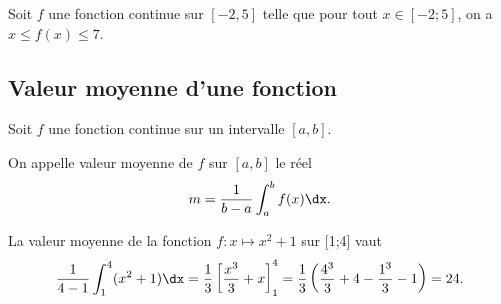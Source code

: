 \documentclass[11pt,fleqn, openany]{book} %
\begin{document}
\begin{example}Soit $f$ une fonction continue sur $[-2,5]$ telle que pour tout $x\in [-2;5]$, on a $x\leqslant f(x) \leqslant 7$.


\vskip100pt

\end{example}

\subsection{Valeur moyenne d'une fonction}

\begin{definition} Soit $f$ une fonction continue sur un intervalle $[a,b]$.

On appelle valeur moyenne de $f$ sur $[a,b]$ le réel \[m=\dfrac{1}{b-a}\displaystyle\int_{a}^b f(x)\dx.\]\end{definition}

\begin{example}La valeur moyenne de la fonction $f:x\mapsto x^2+1$ sur [1;4] vaut
\[ \dfrac{1}{4-1} \int_{1}^4 (x^2+1)\dx = \dfrac{1}{3}\left[ \dfrac{x^3}{3}+x\right]^4_1=\dfrac{1}{3}\left(\dfrac{4^3}{3}+4-\dfrac{1^3}{3}-1\right)=24.\]\vspace{-0.5cm}\end{example}
\end{document}
